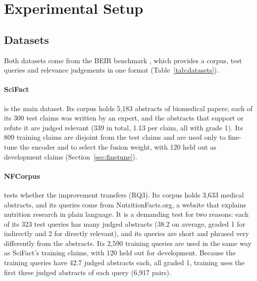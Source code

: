 \section{Experimental Setup}
\label{sec:setup}

\subsection{Datasets}
\label{sec:datasets}

Both datasets come from the BEIR benchmark \parencite{thakur2021beir}, which provides a corpus,
test queries and relevance judgements in one format (Table~\ref{tab:datasets}).

\paragraph{SciFact} \parencite{wadden2020scifact} is the main dataset. Its corpus holds 5,183
abstracts of biomedical papers; each of its 300 test claims was written by an expert, and the
abstracts that support or refute it are judged relevant (339 in total, 1.13 per claim, all with
grade 1). Its 809 training claims are disjoint from the test claims and are used only to
fine-tune the encoder and to select the fusion weight, with 120 held out as development claims
(Section~\ref{sec:finetune}).

\paragraph{NFCorpus} \parencite{boteva2016nfcorpus} tests whether the improvement transfers
(RQ3). Its corpus holds 3,633 medical abstracts, and its queries come from NutritionFacts.org, a
website that explains nutrition research in plain language. It is a demanding test for two
reasons: each of its 323 test queries has many judged abstracts (38.2 on average, graded 1 for
indirectly and 2 for directly relevant), and its queries are short and phrased very differently
from the abstracts. Its 2,590 training queries are used in the same way as SciFact's training
claims, with 120 held out for development. Because the training queries have 42.7 judged
abstracts each, all graded 1, training uses the first three judged abstracts of each query
(6,917 pairs).

